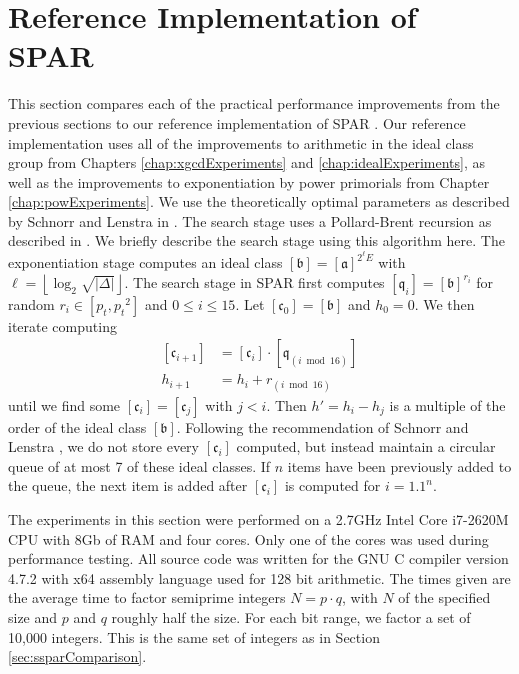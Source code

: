 \documentclass{ucalgthes1}
\theoremstyle{definition}
\newcommand{\floor}[1]{\left\lfloor #1 \right\rfloor}
\newcommand{\ideal}{\mathfrak}
\newcommand{\idealclass}[1]{\left[ \ideal #1 \right]}
\newcommand{\aclass}{\idealclass a}
\newcommand{\bclass}{\idealclass b}
\newcommand{\hdelta}{\sqrt{|\Delta|}}
\newcommand{\compiler}{GNU C compiler version 4.7.2}
\newcommand{\cpu}{2.7GHz Intel Core i7-2620M CPU}
\begin{document}
\clearpage

\section{Reference Implementation of SPAR}
\label{sec:referenceSpar}

This section compares each of the practical performance improvements from the previous sections to our reference implementation of SPAR \cite{refspar}.  Our reference implementation uses all of the improvements to arithmetic in the ideal class group from Chapters \ref{chap:xgcdExperiments} and \ref{chap:idealExperiments}, as well as the improvements to exponentiation by power primorials from Chapter \ref{chap:powExperiments}.  We use the theoretically optimal parameters as described by Schnorr and Lenstra in \cite{Schnorr1984}.  The search stage uses a Pollard-Brent recursion \cite{Brent1980} as described in \cite[p.296]{Schnorr1984}.  We briefly describe the search stage using this algorithm here.  The exponentiation stage computes an ideal class $\bclass = \aclass^{2^\ell E}$ with $\ell = \floor{\log_2 \hdelta}$.  The search stage in SPAR first computes $\idealclass{q_i} = \bclass^{r_i}$ for random $r_i \in [p_t, {p_t}^2]$ and $0 \le i \le 15$.  Let $\idealclass{c_0} = \bclass$ and $h_0 = 0$.  We then iterate computing
\begin{align*}
	\idealclass{c_{i+1}} &= \idealclass{c_i} \cdot \idealclass{q_{(i \bmod 16)}} \\
	h_{i+1} &= h_i + r_{(i \bmod 16)}
\end{align*}
until we find some $\idealclass{c_i} = \idealclass{c_j}$ with $j < i$.  Then $h' = h_i - h_j$ is a multiple of the order of the ideal class $\bclass$.  Following the recommendation of Schnorr and Lenstra \cite[p.296]{Schnorr1984}, we do not store every $\idealclass{c_i}$ computed, but instead maintain a circular queue of at most 7 of these ideal classes.  If $n$ items have been previously added to the queue, the next item is added after $\idealclass{c_i}$ is computed for $i = 1.1^n$.

The experiments in this section were performed on a \cpu{} with 8Gb of RAM and four cores.  Only one of the cores was used during performance testing.  All source code was written for the \compiler{} with x64 assembly language used for 128 bit arithmetic.  The times given are the average time to factor semiprime integers $N = p \cdot q$, with $N$ of the specified size and $p$ and $q$ roughly half the size.  For each bit range, we factor a set of 10,000 integers.  This is the same set of integers as in Section \ref{sec:ssparComparison}.
\end{document}

